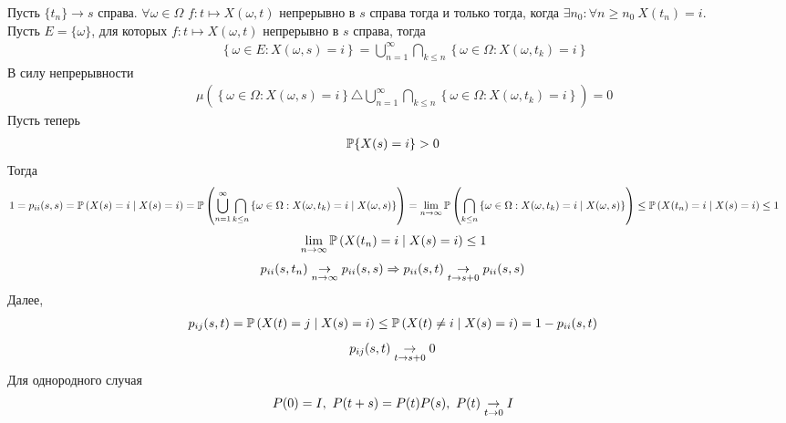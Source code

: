 \begin{Proof}
    Пусть $\{t_n\} \to s$ справа. $\forall \omega \in \Omega$ $f: t \mapsto
    X(\omega, t)$ непрерывно в $s$ справа тогда и только тогда, когда $\exists
    n_0: \forall n \geq n_0 \ X(t_n) = i$.
    \\
    Пусть $E = \{\omega\}$, для которых $f: t \mapsto X(\omega, t)$
    непрерывно в $s$ справа, тогда
    \begin{align*}
      & \left\{ \omega \in E: X(\omega,s)=i \right\} = \bigcup_{n=1}^\infty \bigcap_{k \leq n}\left\{ \omega \in \Omega: X(\omega, t_k) = i \right\}
    \end{align*}
    В силу непрерывности
    \begin{align*}
      & \mu \left( \left\{ \omega \in \Omega: X(\omega,s)=i \right\} \triangle \bigcup_{n=1}^\infty \bigcap_{k \leq n}\left\{ \omega \in \Omega: X(\omega, t_k) = i \right\} \right) = 0
    \end{align*}
    Пусть теперь
    \begin{align*}
      & \mathbb{P}\{X(s) = i\} > 0
    \end{align*}
    Тогда
    \begin{align*}
      & 1 = p_{ii}(s,s) = \mathbb{P}\left( X(s) = i \mid X(s) = i \right) = \mathbb{P}\left( \bigcup_{n=1}^\infty \bigcap_{k \leq n}\left\{ \omega \in \Omega: X(\omega, t_k) = i \mid X(\omega, s)\right\} \right) = \lim_{n\to \infty}\mathbb{P}\left( \bigcap_{k \leq n}\left\{ \omega \in \Omega: X(\omega, t_k) = i \mid X(\omega, s)\right\} \right) \leq \mathbb{P}\left( X(t_n) = i \mid X(s) = i \right) \leq 1
    \end{align*}
    \begin{align*}
      & \lim_{n \to \infty} \mathbb{P}\left( X(t_n) = i \mid X(s) = i \right) \leq 1
    \end{align*}
    \begin{align*}
      & p_{ii}(s,t_n) \underset{n \to \infty}\rightarrow p_{ii}(s,s) \Rightarrow p_{ii}(s,t) \underset{t \to s+0}\rightarrow p_{ii}(s,s)
    \end{align*}
    Далее,
    \begin{align*}
      & p_{ij}(s,t) = \mathbb{P}\left( X(t) = j \mid X(s) = i \right)\leq \mathbb{P}\left( X(t)\neq i \mid X(s) = i \right) = 1 - p_{ii}(s,t)
    \end{align*}
    \begin{align*}
      & p_{ij}(s,t) \underset{t \to s+0}\rightarrow 0
    \end{align*}
    Для однородного случая
    \begin{align*}
      & P(0) = I, \ P(t+s) = P(t)P(s), \ P(t) \underset{t \to 0}\rightarrow I
    \end{align*}
\end{Proof}
